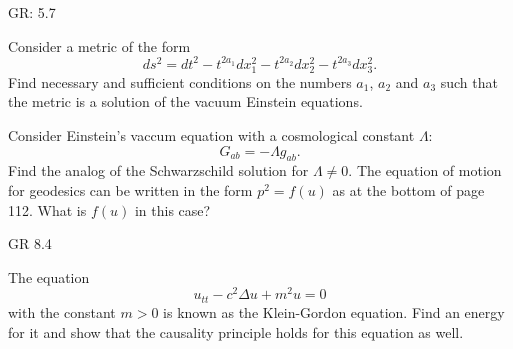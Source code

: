 \documentclass[minion]{homework}
\begin{document}
\hproblem GR: 5.7

\hproblem Consider a metric of the form
\begin{equation}
ds^2 = dt^2 - t^{2a_1} dx_1^2
- t^{2a_2} dx_2^2
- t^{2a_3} dx_3^2.
\end{equation}
Find necessary and sufficient conditions on the numbers $a_1$, $a_2$ and $a_3$
such that the metric is a solution of the vacuum Einstein equations.

\hproblem Consider Einstein's vaccum equation with a cosmological constant $\Lambda$:
\[
G_{ab} =-\Lambda g_{ab}.
\]
Find the analog of the Schwarzschild solution for $\Lambda\neq 0$.  The equation
of motion for geodesics can be written in the form $p^2=f(u)$ as at the bottom
of page 112.  What is $f(u)$ in this case?

\hproblem GR 8.4

\hproblem The equation
\begin{equation}
u_{tt}-c^2\Delta u + m^2 u = 0
\end{equation}
with the constant $m>0$ is known as the Klein-Gordon equation.  Find an energy
for it and show that the causality principle holds for this equation as well.



\end{document}
